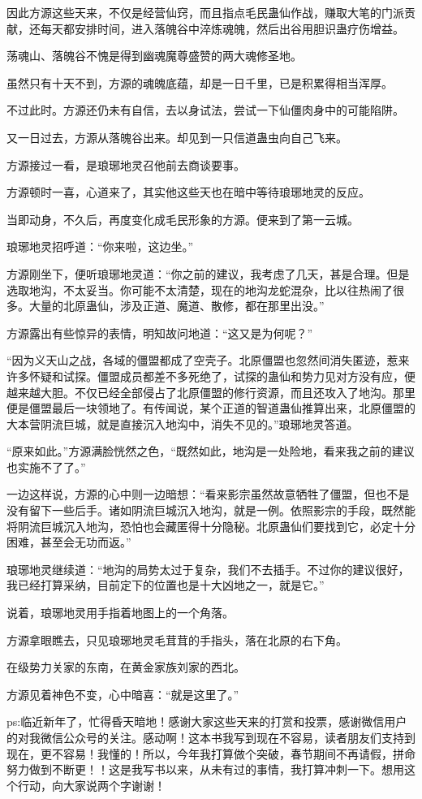 \begin{this_body}
因此方源这些天来，不仅是经营仙窍，而且指点毛民蛊仙作战，赚取大笔的门派贡献，还每天都安排时间，进入落魄谷中淬炼魂魄，然后出谷用胆识蛊疗伤增益。

荡魂山、落魄谷不愧是得到幽魂魔尊盛赞的两大魂修圣地。

虽然只有十天不到，方源的魂魄底蕴，却是一日千里，已是积累得相当浑厚。

不过此时。方源还仍未有自信，去以身试法，尝试一下仙僵肉身中的可能陷阱。

又一日过去，方源从落魄谷出来。却见到一只信道蛊虫向自己飞来。

方源接过一看，是琅琊地灵召他前去商谈要事。

方源顿时一喜，心道来了，其实他这些天也在暗中等待琅琊地灵的反应。

当即动身，不久后，再度变化成毛民形象的方源。便来到了第一云城。

琅琊地灵招呼道：“你来啦，这边坐。”

方源刚坐下，便听琅琊地灵道：“你之前的建议，我考虑了几天，甚是合理。但是选取地沟，不太妥当。你可能不太清楚，现在的地沟龙蛇混杂，比以往热闹了很多。大量的北原蛊仙，涉及正道、魔道、散修，都在那里出没。”

方源露出有些惊异的表情，明知故问地道：“这又是为何呢？”

“因为义天山之战，各域的僵盟都成了空壳子。北原僵盟也忽然间消失匿迹，惹来许多怀疑和试探。僵盟成员都差不多死绝了，试探的蛊仙和势力见对方没有应，便越来越大胆。不仅已经全部侵占了北原僵盟的修行资源，而且还攻入了地沟。那里便是僵盟最后一块领地了。有传闻说，某个正道的智道蛊仙推算出来，北原僵盟的大本营阴流巨城，就是直接沉入地沟中，消失不见的。”琅琊地灵答道。

“原来如此。”方源满脸恍然之色，“既然如此，地沟是一处险地，看来我之前的建议也实施不了了。”

一边这样说，方源的心中则一边暗想：“看来影宗虽然故意牺牲了僵盟，但也不是没有留下一些后手。诸如阴流巨城沉入地沟，就是一例。依照影宗的手段，既然能将阴流巨城沉入地沟，恐怕也会藏匿得十分隐秘。北原蛊仙们要找到它，必定十分困难，甚至会无功而返。”

琅琊地灵继续道：“地沟的局势太过于复杂，我们不去插手。不过你的建议很好，我已经打算采纳，目前定下的位置也是十大凶地之一，就是它。”

说着，琅琊地灵用手指着地图上的一个角落。

方源拿眼瞧去，只见琅琊地灵毛茸茸的手指头，落在北原的右下角。

在级势力关家的东南，在黄金家族刘家的西北。

方源见着神色不变，心中暗喜：“就是这里了。”

ps:临近新年了，忙得昏天暗地！感谢大家这些天来的打赏和投票，感谢微信用户的对我微信公众号的关注。感动啊！这本书我写到现在不容易，读者朋友们支持到现在，更不容易！我懂的！所以，今年我打算做个突破，春节期间不再请假，拼命努力做到不断更！！这是我写书以来，从未有过的事情，我打算冲刺一下。想用这个行动，向大家说两个字谢谢！

\end{this_body}

